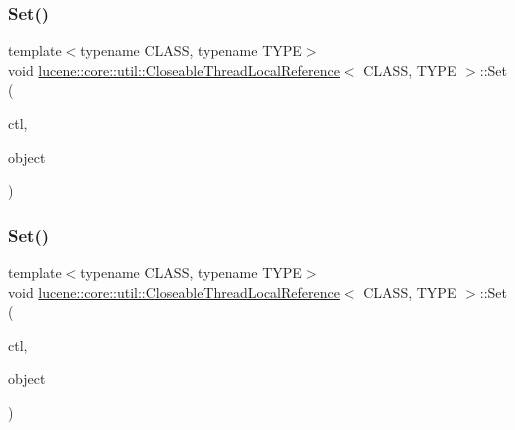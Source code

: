 \subsubsection{\texorpdfstring{Set()}{Set()}\hspace{0.1cm}{\footnotesize\ttfamily [1/2]}}
{\footnotesize\ttfamily template$<$typename C\+L\+A\+SS, typename T\+Y\+PE$>$ \\
void \mbox{\hyperlink{classlucene_1_1core_1_1util_1_1CloseableThreadLocalReference}{lucene\+::core\+::util\+::\+Closeable\+Thread\+Local\+Reference}}$<$ C\+L\+A\+SS, T\+Y\+PE $>$\+::Set (\begin{DoxyParamCaption}\item[{\mbox{\hyperlink{classlucene_1_1core_1_1util_1_1CloseableThreadLocal}{Closeable\+Thread\+Local}}$<$ C\+L\+A\+SS, T\+Y\+PE $>$ $\ast$}]{ctl,  }\item[{const T\+Y\+PE \&}]{object }\end{DoxyParamCaption})\hspace{0.3cm}{\ttfamily [inline]}}

\mbox{\label{classlucene_1_1core_1_1util_1_1CloseableThreadLocalReference_a2a565539a30bc0a9cac563262989775f}} 
\subsubsection{\texorpdfstring{Set()}{Set()}\hspace{0.1cm}{\footnotesize\ttfamily [2/2]}}
{\footnotesize\ttfamily template$<$typename C\+L\+A\+SS, typename T\+Y\+PE$>$ \\
void \mbox{\hyperlink{classlucene_1_1core_1_1util_1_1CloseableThreadLocalReference}{lucene\+::core\+::util\+::\+Closeable\+Thread\+Local\+Reference}}$<$ C\+L\+A\+SS, T\+Y\+PE $>$\+::Set (\begin{DoxyParamCaption}\item[{\mbox{\hyperlink{classlucene_1_1core_1_1util_1_1CloseableThreadLocal}{Closeable\+Thread\+Local}}$<$ C\+L\+A\+SS, T\+Y\+PE $>$ $\ast$}]{ctl,  }\item[{T\+Y\+PE \&\&}]{object }\end{DoxyParamCaption})\hspace{0.3cm}{\ttfamily [inline]}}



